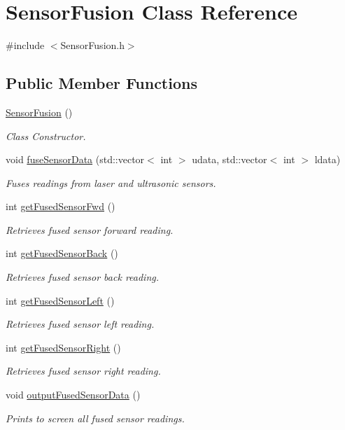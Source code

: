 \hypertarget{classSensorFusion}{\section{Sensor\-Fusion Class Reference}
\label{classSensorFusion}
}


{\ttfamily \#include $<$Sensor\-Fusion.\-h$>$}

\subsection*{Public Member Functions}
\begin{DoxyCompactItemize}
\item 
\hyperlink{classSensorFusion_ad193998535aeea57d9e2bd468e37ee12}{Sensor\-Fusion} ()
\begin{DoxyCompactList}\small\item\em Class Constructor. \end{DoxyCompactList}\item 
void \hyperlink{classSensorFusion_a45b1154d5566e2a3368836b4aa5a3a4e}{fuse\-Sensor\-Data} (std\-::vector$<$ int $>$ udata, std\-::vector$<$ int $>$ ldata)
\begin{DoxyCompactList}\small\item\em Fuses readings from laser and ultrasonic sensors. \end{DoxyCompactList}\item 
int \hyperlink{classSensorFusion_afc393d9d590acb884b37b720653d5ab5}{get\-Fused\-Sensor\-Fwd} ()
\begin{DoxyCompactList}\small\item\em Retrieves fused sensor forward reading. \end{DoxyCompactList}\item 
int \hyperlink{classSensorFusion_aecba8be602ad5a5516c35ce2de0ef3cb}{get\-Fused\-Sensor\-Back} ()
\begin{DoxyCompactList}\small\item\em Retrieves fused sensor back reading. \end{DoxyCompactList}\item 
int \hyperlink{classSensorFusion_a66d934da01cf106c27df5242e3e7394a}{get\-Fused\-Sensor\-Left} ()
\begin{DoxyCompactList}\small\item\em Retrieves fused sensor left reading. \end{DoxyCompactList}\item 
int \hyperlink{classSensorFusion_a4b408c81cc07c3b81d3bd34ad079715f}{get\-Fused\-Sensor\-Right} ()
\begin{DoxyCompactList}\small\item\em Retrieves fused sensor right reading. \end{DoxyCompactList}\item 
void \hyperlink{classSensorFusion_a458c1aed280b12273476f0dd7f57f4c8}{output\-Fused\-Sensor\-Data} ()
\begin{DoxyCompactList}\small\item\em Prints to screen all fused sensor readings. \end{DoxyCompactList}\end{DoxyCompactItemize}


